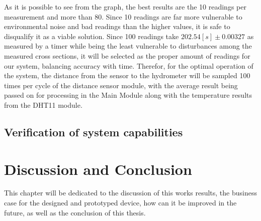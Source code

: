 \documentclass[twoside]{ctuthesis}
\theoremstyle{plain}
\theoremstyle{definition}
\theoremstyle{note}
\begin{document}
As it is possible to see from the graph, the best results are the 10 readings per measurement and more than 80. Since 10 readings are far more vulnerable to environmental noise and bad readings than the higher values, it is safe to disqualify it as a viable solution. Since 100 readings take $202.54[s]\pm0.00327$ as measured by a timer while being the least vulnerable to disturbances among the measured cross sections, it will be selected as the proper amount of readings for our system, balancing accuracy with time.
Therefor, for the optimal operation of the system, the distance from the sensor to the hydrometer will be sampled 100 times per cycle of the distance sensor module, with the average result being passed on for processing in the Main Module along with the temperature results from the DHT11 module.

\section{Verification of system capabilities}






\pagebreak 

\begingroup
\renewcommand{\cleardoublepage}{}
\renewcommand{\clearpage}{}
\chapter{Discussion and Conclusion}
\endgroup
This chapter will be dedicated to the discussion of this works results, the business case for the designed and prototyped device, how can it be improved in the future, as well as the conclusion of this thesis.
\end{document}
